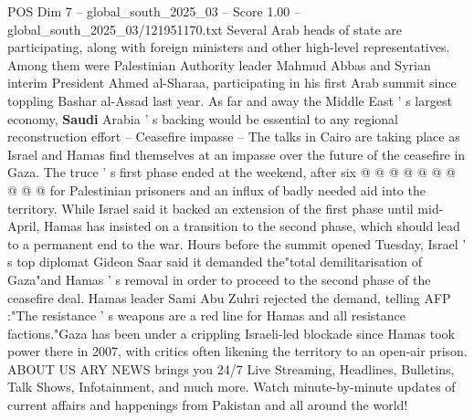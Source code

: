 \begin{textsample}{POS Dim 7 – global\_south\_2025\_03 – Score 1.00 – global\_south\_2025\_03/121951170.txt}
Several Arab heads of state are participating, along with foreign ministers and other high-level representatives.
Among them were Palestinian Authority leader Mahmud Abbas and Syrian interim President Ahmed al-Sharaa, participating in his first Arab summit since toppling Bashar al-Assad last year.
As far and away the Middle East ' s largest economy, \textbf{Saudi} Arabia ' s backing would be essential to any regional reconstruction effort -- Ceasefire impasse -- The talks in Cairo are taking place as Israel and Hamas find themselves at an impasse over the future of the ceasefire in Gaza.
The truce ' s first phase ended at the weekend, after six @ @ @ @ @ @ @ @ @ @ for Palestinian prisoners and an influx of badly needed aid into the territory.
While Israel said it backed an extension of the first phase until mid-April, Hamas has insisted on a transition to the second phase, which should lead to a permanent end to the war.
Hours before the summit opened Tuesday, Israel ' s top diplomat Gideon Saar said it demanded the"total demilitarisation of Gaza"and Hamas ' s removal in order to proceed to the second phase of the ceasefire deal.
Hamas leader Sami Abu Zuhri rejected the demand, telling AFP :"The resistance ' s weapons are a red line for Hamas and all resistance factions."Gaza has been under a crippling Israeli-led blockade since Hamas took power there in 2007, with critics often likening the territory to an open-air prison.
ABOUT US ARY NEWS brings you 24/7 Live Streaming, Headlines, Bulletins, Talk Shows, Infotainment, and much more.
Watch minute-by-minute updates of current affairs and happenings from Pakistan and all around the world!

\end{textsample}
